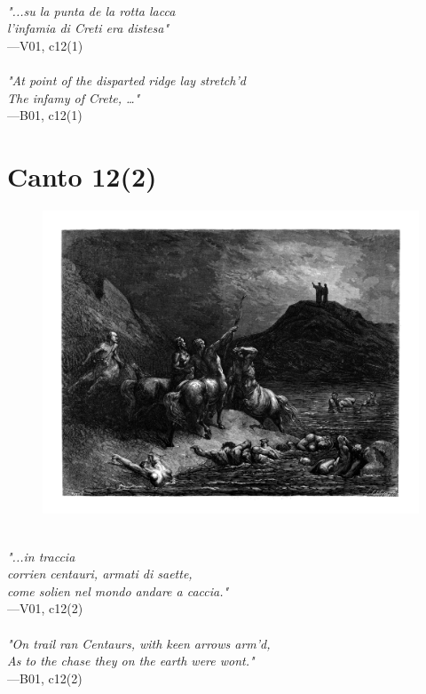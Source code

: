 \documentclass[../Dore_vision.tex]{subfiles}
\begin{document}
\begin{center}
\begin{minipage}{0.8\linewidth}
\textit{\\
"...su la punta de la rotta lacca\\l’infamia di Creti era distesa"} \\
—V01, c12(1) \\~\\
\textit{"At point of the disparted ridge lay stretch'd\\The infamy of Crete, …"} \\
—B01, c12(1)
\end{minipage}
\end{center}

\newpage

\section{Canto 12(2)}

\begin{figure}[ht]
\centering
\includegraphics[height=\figsize]{illustrations/book_1/V01, c12(2).jpg}
\end{figure}

\begin{center}
\begin{minipage}{0.8\linewidth}
\textit{\\
"...in traccia\\corrien centauri, armati di saette,\\come solien nel mondo andare a caccia."} \\
—V01, c12(2) \\~\\
\textit{"On trail ran Centaurs, with keen arrows arm'd,\\As to the chase they on the earth were wont."} \\
—B01, c12(2)
\end{minipage}
\end{center}
\end{document}
